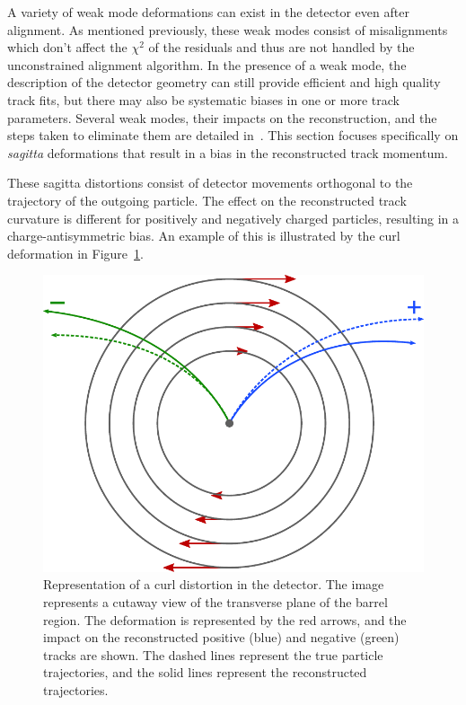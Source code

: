 A variety of weak mode deformations can exist in the detector even after alignment.
As mentioned previously, these weak modes consist of misalignments which don't affect the $\chi^2$ of the residuals and thus are not handled by the unconstrained alignment algorithm.
In the presence of a weak mode, the description of the detector geometry can still provide efficient and high quality track fits, but there may also be systematic biases in one or more track parameters.
Several weak modes, their impacts on the reconstruction, and the steps taken to eliminate them are detailed in~\cite{2014.alignment-performance-8tev, 2012.alignment-systematics}. 
This section focuses specifically on \emph{sagitta} deformations that result in a bias in the reconstructed track momentum.

These sagitta distortions consist of detector movements orthogonal to the trajectory of the outgoing particle.
The effect on the reconstructed track curvature is different for positively and negatively charged particles, resulting in a charge-antisymmetric bias.
An example of this is illustrated by the curl deformation in Figure~\ref{fig:align_radial_distortion}.

\begin{figure}[htbp]
  \centering
  \includegraphics[width=.45\textwidth]{figs/alignment/radial-distortion}
  \caption{Representation of a curl distortion in the detector.  The image represents a cutaway view of the transverse plane of the barrel region.  The deformation is represented by the red arrows, and the impact on the reconstructed positive (blue) and negative (green) tracks are shown.  The dashed lines represent the true particle trajectories, and the solid lines represent the reconstructed trajectories.}
  \label{fig:align_radial_distortion}
\end{figure}

